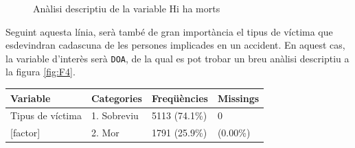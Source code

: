 \documentclass[12pt,longbibliography]{article}
\theoremstyle{definition}
\theoremstyle{remark}
\begin{document}
\begin{figure}[h!]
\par
{}%
\hfill
{}%
\par

\caption{Anàlisi descriptiu de la variable Hi ha morts}
\label{fig:F3}
\end{figure}


Seguint aquesta línia, serà també de gran importància el tipus de víctima que esdevindran cadascuna de les persones implicades en un accident. En aquest cas, la variable d'interès serà \texttt{DOA}, de la qual es pot trobar un breu anàlisi descriptiu a la figura \ref{fig:F4}.

\begin{table}[H]
\centering
\begin{tabular}{llll}
\hline
Variable         & Categories  & Freqüències   & Missings \\ \hline
Tipus de víctima & 1. Sobreviu & 5113 (74.1\%) & 0        \\
{[}factor{]}     & 2. Mor      & 1791 (25.9\%) & (0.00\%) \\ \hline
\end{tabular}
\end{table}
\end{document}
